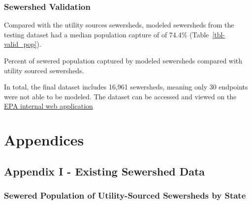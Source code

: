 \documentclass[
  letterpaper,
  DIV=11,
  numbers=noendperiod]{scrartcl}
\begin{document}
\subsubsection{Sewershed Validation}\label{sewershed-validation}

Compared with the utility sources sewersheds, modeled sewersheds from
the testing dataset had a median population capture of of 74.4\%
(Table~\ref{tbl-valid_pop}).

\begin{table}

\caption{\label{tbl-valid_pop}Percent of sewered population captured by
modeled sewersheds compared with utility sourced sewersheds.}


\end{table}%

In total, the final dataset includes 16,961 sewersheds, meaning only 30
endpoints were not able to be modeled. The dataset can be accessed and
viewed on the
\href{https://epa.maps.arcgis.com/apps/instant/atlas/index.html?appid=5b098638234349dd8dca7f764e7aa4e3}{EPA
internal web application}

\section{Appendices}\label{appendices}

\subsection{Appendix I - Existing Sewershed
Data}\label{appendix-i---existing-sewershed-data}

\subsubsection{Sewered Population of Utility-Sourced Sewersheds by
State}\label{sewered-population-of-utility-sourced-sewersheds-by-state}
\end{document}

